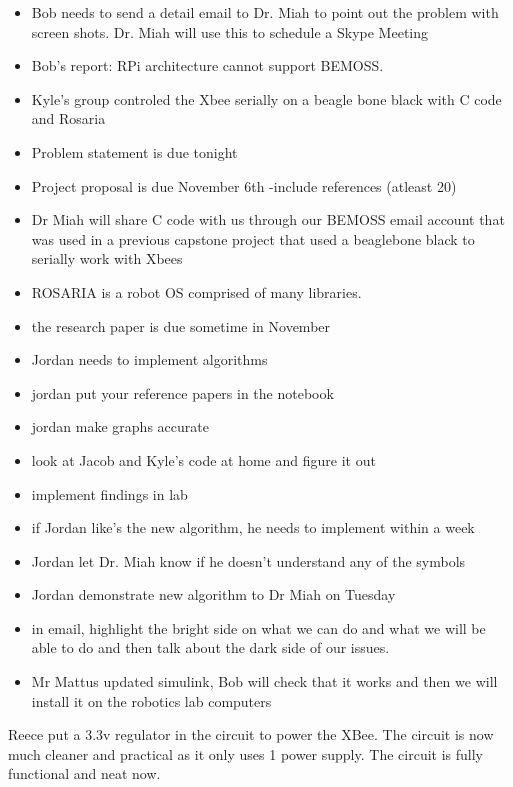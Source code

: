 \documentclass[fontsize=11pt, %
                             paper=letter, %
                             twoside, %
                             captions=tableheading,
                             index=totoc,
                             hyperref]{labbook}
\begin{document}
\begin{itemize}
    \item Bob needs to send a detail email to Dr. Miah to point out the problem with screen shots. Dr. Miah will use this to schedule a Skype Meeting 
    \item Bob's report: RPi architecture cannot support BEMOSS. 
    \item Kyle's group controled the Xbee serially on a beagle bone black with C code and Rosaria 
    \item Problem statement is due tonight 
    \item Project proposal is due November 6th -include references (atleast 20) 
    \item Dr Miah will share C code with us through our BEMOSS email account that was used in a previous capstone project that used a beaglebone black to serially work with Xbees 
    \item ROSARIA is a robot OS comprised of many libraries. 
    \item the research paper is due sometime in November 
    \item Jordan needs to implement algorithms 
    \item jordan put your reference papers in the notebook 
    \item jordan make graphs accurate 
    \item look at Jacob and Kyle's code at home and figure it out
    \item implement findings in lab 
    \item if Jordan like's the new algorithm, he needs to implement within a week 
    \item Jordan let Dr. Miah know if he doesn't understand any of the symbols 
    \item Jordan demonstrate new algorithm to Dr Miah on Tuesday 
    \item in email, highlight the bright side on what we can do and what we will be able to do and then talk about the dark side of our issues. 
    \item Mr Mattus updated simulink, Bob will check that it works and then we will install it on the robotics lab computers 
\end{itemize}

Reece put a 3.3v regulator in the circuit to power the XBee. The circuit is now much cleaner and practical as it only uses 1 power supply. The circuit is fully functional and neat now. 
\end{document}
